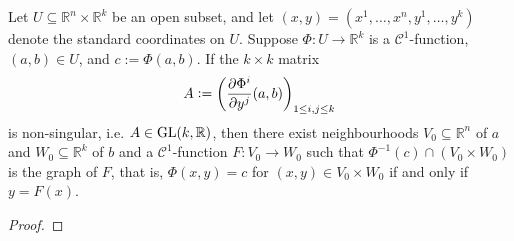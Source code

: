 \begin{theorem}
	Let $U \subseteq \mathbb{R}^n \times \mathbb{R}^k$ be an open subset, and let $(x,y) = (x^1,\dots,x^n,y^1,\dots,y^k)$ denote the standard coordinates on $U$. Suppose $\Phi: U \to \mathbb{R}^k$ is a $\mathscr{C}^1$-function, $(a,b) \in U$, and $c := \Phi(a,b)$. If the $k \times k$ matrix
	\begin{equation}
		A := \del[3]{\frac{\partial\Phi^i}{\partial y^j}(a,b)}_{1 \leq i,j \leq k}
	\end{equation}
	\noindent is non-singular, i.e. $A \in \operatorname{GL}(k,\mathbb{R})$, then there exist neighbourhoods $V_0 \subseteq \mathbb{R}^n$ of $a$ and $W_0 \subseteq \mathbb{R}^k$ of $b$ and a $\mathscr{C}^1$-function $F: V_0 \to W_0$ such that $\Phi^{-1}(c) \cap (V_0 \times W_0)$ is the graph of $F$, that is, $\Phi(x,y) = c$ for $(x,y) \in V_0 \times W_0$ if and only if $y = F(x)$.
	\label{thm:implicit_fun_thm}
\end{theorem}

\begin{proof}
	
\end{proof}
\printbibliography

